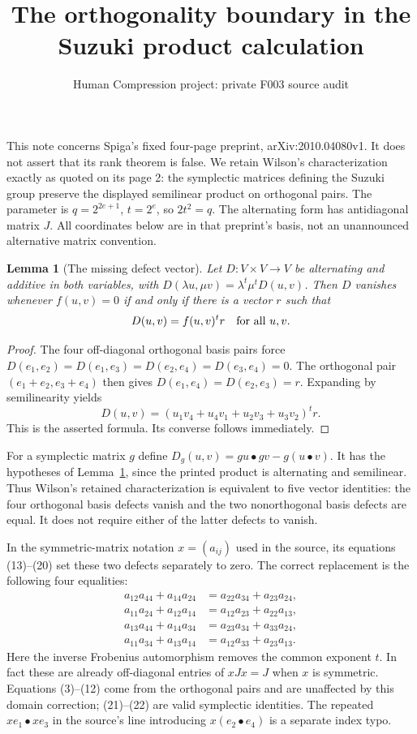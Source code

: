 \documentclass[11pt,a4paper]{article}
\title{The orthogonality boundary in the Suzuki product calculation}
\author{Human Compression project: private F003 source audit}\date{}
\newtheorem{lemma}{Lemma}\newtheorem{proposition}[lemma]{Proposition}
\begin{document}
\maketitle
This note concerns Spiga's fixed four-page preprint,
arXiv:2010.04080v1. It does not assert that its rank theorem is false.
We retain Wilson's characterization exactly as quoted on its page 2:
the symplectic matrices defining the Suzuki group preserve the displayed
semilinear product on orthogonal pairs. The parameter is
$q=2^{2e+1}$, $t=2^e$, so $2t^2=q$. The alternating form has
antidiagonal matrix $J$. All coordinates below are in that preprint's
basis, not an unannounced alternative matrix convention.

\begin{lemma}[The missing defect vector]\label{defect}
Let $D:V\times V\to V$ be alternating and additive in both variables,
with $D(\lambda u,\mu v)=\lambda^t\mu^tD(u,v)$. Then $D$ vanishes
whenever $f(u,v)=0$ if and only if there is a vector $r$ such that
\[
 D(u,v)=f(u,v)^t r\quad\hbox{for all }u,v.
\]
\end{lemma}
\begin{proof}
The four off-diagonal orthogonal basis pairs force
$D(e_1,e_2)=D(e_1,e_3)=D(e_2,e_4)=D(e_3,e_4)=0$.
The orthogonal pair $(e_1+e_2,e_3+e_4)$ then gives
$D(e_1,e_4)=D(e_2,e_3)=r$. Expanding by semilinearity yields
\[
D(u,v)=(u_1v_4+u_4v_1+u_2v_3+u_3v_2)^t r.
\]
This is the asserted formula. Its converse follows immediately.
\end{proof}

For a symplectic matrix $g$ define
$D_g(u,v)=gu\mathbin\bullet gv-g(u\mathbin\bullet v)$.
It has the hypotheses of Lemma~\ref{defect}, since the printed product
is alternating and semilinear. Thus Wilson's retained characterization
is equivalent to five vector identities: the four orthogonal basis
defects vanish and the two nonorthogonal basis defects are equal.
It does not require either of the latter defects to vanish.

In the symmetric-matrix notation $x=(a_{ij})$ used in the source, its
equations (13)--(20) set these two defects separately to zero. The
correct replacement is the following four equalities:
\begin{align*}
a_{12}a_{44}+a_{14}a_{24}&=a_{22}a_{34}+a_{23}a_{24},\\
a_{11}a_{24}+a_{12}a_{14}&=a_{12}a_{23}+a_{22}a_{13},\\
a_{13}a_{44}+a_{14}a_{34}&=a_{23}a_{34}+a_{33}a_{24},\\
a_{11}a_{34}+a_{13}a_{14}&=a_{12}a_{33}+a_{23}a_{13}.
\end{align*}
Here the inverse Frobenius automorphism removes the common exponent
$t$. In fact these are already off-diagonal entries of $xJx=J$ when
$x$ is symmetric. Equations (3)--(12) come from the orthogonal pairs
and are unaffected by this domain correction; (21)--(22) are valid
symplectic identities. The repeated $xe_1\bullet xe_3$ in the source's
line introducing $x(e_2\bullet e_4)$ is a separate index typo.
\end{document}
